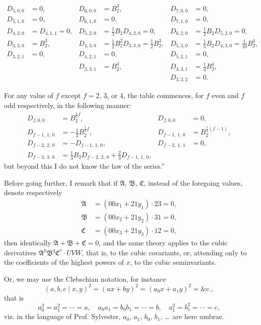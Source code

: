 \documentclass[11pt,a4paper]{book}
\begin{document}
\begin{align*}
D_{5,0,0} &= 0, & D_{6,0,0} &= B_2^3, & D_{7,0,0} &= 0,\\
D_{5,1,0} &= 0, & D_{6,1,0} &= 0, & D_{7,1,0} &= 0,\\
D_{4,2,0} &= D_{4,1,1} = 0, & D_{5,2,0} &= \tfrac{1}{3}B_2 D_{4,2,0} = 0, & D_{6,2,0} &= \tfrac{1}{2}B_2 D_{5,2,0} = 0,\\
D_{3,3,0} &= B_2^3, & D_{4,3,0} &= \tfrac{1}{2}B_2^2 D_{3,3,0} = \tfrac{1}{2}B_2^3, & D_{5,3,0} &= \tfrac{1}{5}B_2 D_{4,3,0} = \tfrac{1}{10}B_2^4,\\
D_{3,2,1} &= 0, & D_{4,2,1} &= 0, & D_{5,2,1} &= 0,\\
& & D_{3,3,1} &= B_2^3, & D_{4,3,1} &= \tfrac{1}{4}B_2^4,\\
& & & & D_{3,2,2} &= 0.
\end{align*}

For any value of $f$ except $f = 2$, $3$, or $4$, the table commences, for $f$ even and $f$ odd respectively, in the following manner:
\begin{align*}
D_{f,0,0} &= B_2^{\frac{1}{2}f}, & D_{f,0,0} &= 0,\\
D_{f-1,\,1,\,0} &= -\tfrac{1}{2}B_2^{\frac{1}{2}f}, & D_{f-1,\,1,\,0} &= B_2^{\frac{1}{2}(f-1)},\\
D_{f-2,\,2,\,0} &= -D_{f-1,\,1,\,0}, & D_{f-2,\,1,\,1} &= 0,\\
D_{f-3,\,3,\,0} &= \tfrac{1}{3}B_2 D_{f-2,\,2,\,0} + \tfrac{2}{3}D_{f-1,\,1,\,0},
\end{align*}
but beyond this I do not know the law of the series.''

Before going further, I remark that if $\mathfrak{A}$, $\mathfrak{B}$, $\mathfrak{C}$, instead of the foregoing values, denote respectively
\begin{align*}
\mathfrak{A} &= (00x_1 + 21y_1) \cdot 23 = 0,\\
\mathfrak{B} &= (00x_2 + 21y_2) \cdot 31 = 0,\\
\mathfrak{C} &= (00x_3 + 21y_3) \cdot 12 = 0,
\end{align*}
then identically $\mathfrak{A} + \mathfrak{B} + \mathfrak{C} = 0$, and the same theory applies to the cubic derivatives $\mathfrak{A}^p \mathfrak{B}^q \mathfrak{C}^r \cdot UVW$, that is, to the cubic covariants, or, attending only to the coefficients of the highest powers of $x$, to the cubic seminvariants.

Or, we may use the Clebschian notation, for instance
\[
(a, b, c \mid x, y)^2 = (ax + by)^2 = (a_0x + a_1y)^2 = \text{\&c.},
\]
that is
\[
a_0^2 = a_1^2 = \cdots = a, \quad a_0a_1 = b_0b_1 = \cdots = b, \quad a_1^2 = b_1^2 = \cdots = c,
\]
viz. in the language of Prof. Sylvester, $a_0$, $a_1$, $b_0$, $b_1$, \ldots\ are here umbrae.
\end{document}
